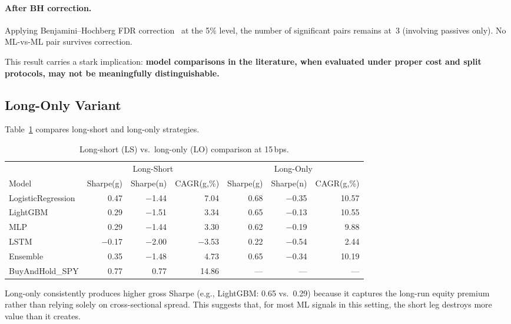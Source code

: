 \documentclass[11pt]{article}
\begin{document}
\paragraph{After BH correction.}
Applying Benjamini--Hochberg FDR correction~\citep{ref_bh} at the 5\% level, the number of significant pairs remains at~3 (involving passives only).
No ML-vs-ML pair survives correction.

This result carries a stark implication: \textbf{model comparisons in the literature, when evaluated under proper cost and split protocols, may not be meaningfully distinguishable.}

\subsection{Long-Only Variant}

Table~\ref{tab:longonly} compares long-short and long-only strategies.

\begin{table}[H]
\centering
\caption{Long-short (LS) vs.\ long-only (LO) comparison at 15\,bps.}
\label{tab:longonly}
\footnotesize
\begin{tabular}{l r r r r r r}
\toprule
 & \multicolumn{3}{c}{Long-Short} & \multicolumn{3}{c}{Long-Only} \\
Model & Sharpe(g) & Sharpe(n) & CAGR(g,\%) & Sharpe(g) & Sharpe(n) & CAGR(g,\%) \\
\midrule
LogisticRegression & 0.47 & $-$1.44 & 7.04 & 0.68 & $-$0.35 & 10.57 \\
LightGBM           & 0.29 & $-$1.51 & 3.34 & 0.65 & $-$0.13 & 10.55 \\
MLP                & 0.29 & $-$1.44 & 3.30 & 0.62 & $-$0.19 & 9.88 \\
LSTM               & $-$0.17 & $-$2.00 & $-$3.53 & 0.22 & $-$0.54 & 2.44 \\
Ensemble           & 0.35 & $-$1.48 & 4.73 & 0.65 & $-$0.34 & 10.19 \\
BuyAndHold\_SPY    & 0.77 & 0.77 & 14.86 & --- & --- & --- \\
\bottomrule
\end{tabular}
\end{table}

Long-only consistently produces higher gross Sharpe (e.g., LightGBM: 0.65 vs.\ 0.29) because it captures the long-run equity premium rather than relying solely on cross-sectional spread.
This suggests that, for most ML signals in this setting, the short leg destroys more value than it creates.
\end{document}

